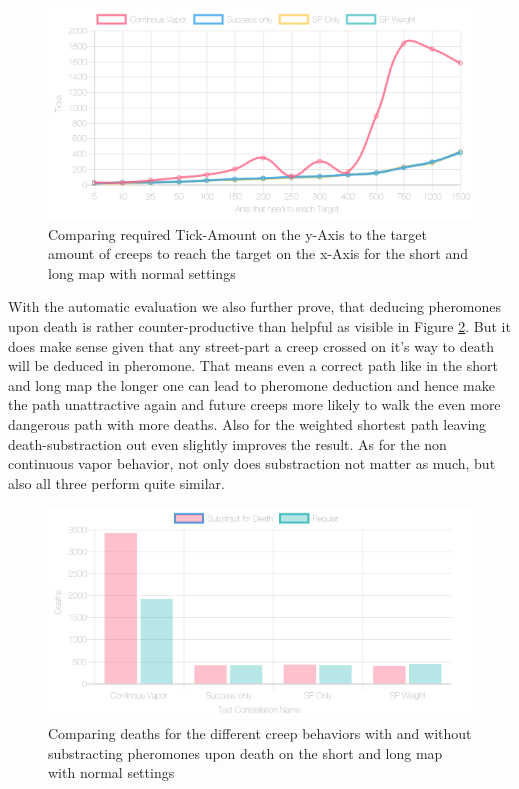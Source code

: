 \begin{figure}[H]
  \centering
  \includegraphics[width=1\linewidth]{images/normalshortandlongwithtowers-ticks-line}
  \caption{Comparing required Tick-Amount on the y-Axis to the target amount of creeps to reach the target on the x-Axis for the short and long map with normal settings}
  \label{fig:shortlongvaptick}
\end{figure}

With the automatic evaluation we also further prove, that deducing pheromones upon death is rather counter-productive than helpful as visible in Figure \ref{fig:deathsubshitty}. But it does make sense given that any street-part a creep crossed on it's way to death will be deduced in pheromone. That means even a correct path like in the short and long map the longer one can lead to pheromone deduction and hence make the path unattractive again and future creeps more likely to walk the even more dangerous path with more deaths.
Also for the weighted shortest path leaving death-substraction out even slightly improves the result. As for the non continuous vapor behavior, not only does substraction not matter as much, but also all three perform quite similar.


\begin{figure}[H]
  \centering
  \includegraphics[width=1\linewidth]{images/normalshortandlongwithtowers-deaths}
  \caption{Comparing deaths for the different creep behaviors with and without substracting pheromones upon death on the short and long map with normal settings}
  \label{fig:deathsubshitty}
\end{figure}

